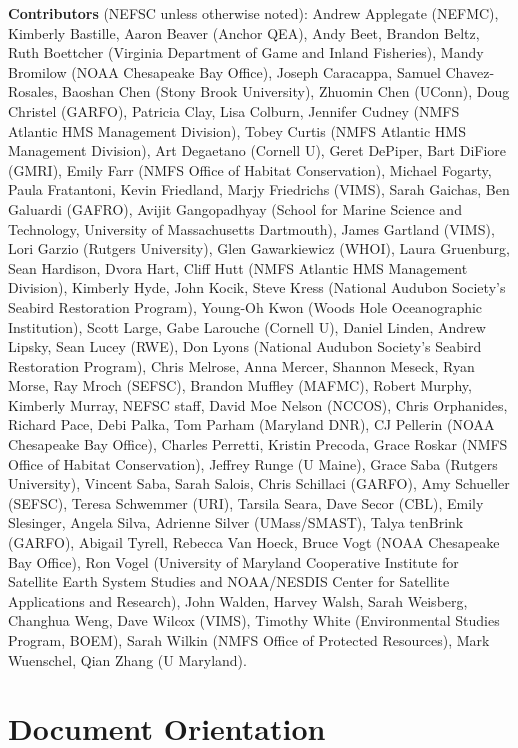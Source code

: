 \documentclass[
  10pt,
]{article}
\begin{document}
\textbf{Contributors} (NEFSC unless otherwise noted): Andrew Applegate (NEFMC), Kimberly Bastille, Aaron Beaver (Anchor QEA), Andy Beet, Brandon Beltz, Ruth Boettcher (Virginia Department of Game and Inland Fisheries), Mandy Bromilow (NOAA Chesapeake Bay Office), Joseph Caracappa, Samuel Chavez-Rosales, Baoshan Chen (Stony Brook University), Zhuomin Chen (UConn), Doug Christel (GARFO), Patricia Clay, Lisa Colburn, Jennifer Cudney (NMFS Atlantic HMS Management Division), Tobey Curtis (NMFS Atlantic HMS Management Division), Art Degaetano (Cornell U), Geret DePiper, Bart DiFiore (GMRI), Emily Farr (NMFS Office of Habitat Conservation), Michael Fogarty, Paula Fratantoni, Kevin Friedland, Marjy Friedrichs (VIMS), Sarah Gaichas, Ben Galuardi (GAFRO), Avijit Gangopadhyay (School for Marine Science and Technology, University of Massachusetts Dartmouth), James Gartland (VIMS), Lori Garzio (Rutgers University), Glen Gawarkiewicz (WHOI), Laura Gruenburg, Sean Hardison, Dvora Hart, Cliff Hutt (NMFS Atlantic HMS Management Division), Kimberly Hyde, John Kocik, Steve Kress (National Audubon Society's Seabird Restoration Program), Young-Oh Kwon (Woods Hole Oceanographic Institution), Scott Large, Gabe Larouche (Cornell U), Daniel Linden, Andrew Lipsky, Sean Lucey (RWE), Don Lyons (National Audubon Society's Seabird Restoration Program), Chris Melrose, Anna Mercer, Shannon Meseck, Ryan Morse, Ray Mroch (SEFSC), Brandon Muffley (MAFMC), Robert Murphy, Kimberly Murray, NEFSC staff, David Moe Nelson (NCCOS), Chris Orphanides, Richard Pace, Debi Palka, Tom Parham (Maryland DNR), CJ Pellerin (NOAA Chesapeake Bay Office), Charles Perretti, Kristin Precoda, Grace Roskar (NMFS Office of Habitat Conservation), Jeffrey Runge (U Maine), Grace Saba (Rutgers University), Vincent Saba, Sarah Salois, Chris Schillaci (GARFO), Amy Schueller (SEFSC), Teresa Schwemmer (URI), Tarsila Seara, Dave Secor (CBL), Emily Slesinger, Angela Silva, Adrienne Silver (UMass/SMAST), Talya tenBrink (GARFO), Abigail Tyrell, Rebecca Van Hoeck, Bruce Vogt (NOAA Chesapeake Bay Office), Ron Vogel (University of Maryland Cooperative Institute for Satellite Earth System Studies and NOAA/NESDIS Center for Satellite Applications and Research), John Walden, Harvey Walsh, Sarah Weisberg, Changhua Weng, Dave Wilcox (VIMS), Timothy White (Environmental Studies Program, BOEM), Sarah Wilkin (NMFS Office of Protected Resources), Mark Wuenschel, Qian Zhang (U Maryland).

\section{Document Orientation}\label{document-orientation}
\end{document}
